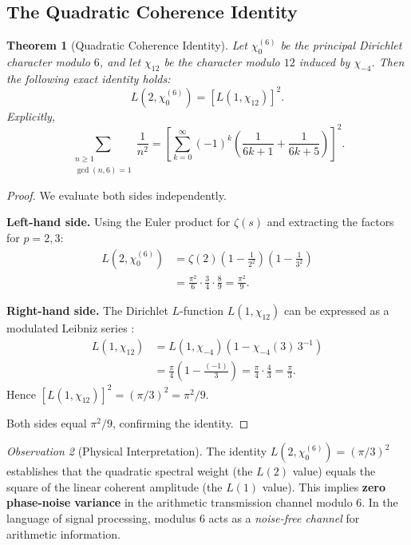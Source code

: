 \documentclass[12pt,a4paper]{article}
\theoremstyle{plain}
\newtheorem{theorem}{Theorem}[section]
\theoremstyle{definition}
\theoremstyle{remark}
\newtheorem{observation}[theorem]{Observation}
\begin{document}
\subsection{The Quadratic Coherence Identity}

\begin{theorem}[Quadratic Coherence Identity]
\label{thm:identity}
Let $\chi_0^{(6)}$ be the principal Dirichlet character modulo $6$, and let $\chi_{12}$ be the character modulo $12$ induced by $\chi_{-4}$. Then the following exact identity holds:
\begin{equation}
L(2, \chi_0^{(6)}) = \left[ L(1, \chi_{12}) \right]^2.
\label{eq:identity}
\end{equation}
Explicitly,
\begin{equation}
\sum_{\substack{n \geq 1 \\ \gcd(n,6)=1}} \frac{1}{n^2} = \left[ \sum_{k=0}^{\infty} (-1)^k \left( \frac{1}{6k+1} + \frac{1}{6k+5} \right) \right]^2.
\label{eq:identity_explicit}
\end{equation}
\end{theorem}

\begin{proof}
We evaluate both sides independently.

\textbf{Left-hand side.} Using the Euler product for $\zeta(s)$ and extracting the factors for $p=2,3$:
\begin{align*}
L(2, \chi_0^{(6)}) &= \zeta(2) \left(1 - \frac{1}{2^2}\right) \left(1 - \frac{1}{3^2}\right) \\
&= \frac{\pi^2}{6} \cdot \frac{3}{4} \cdot \frac{8}{9} = \frac{\pi^2}{9}.
\end{align*}

\textbf{Right-hand side.} The Dirichlet $L$-function $L(1, \chi_{12})$ can be expressed as a modulated Leibniz series \cite{davenport2000}:
\begin{align*}
L(1, \chi_{12}) &= L(1, \chi_{-4}) \left(1 - \chi_{-4}(3) \, 3^{-1}\right) \\
&= \frac{\pi}{4} \left(1 - \frac{(-1)}{3}\right) = \frac{\pi}{4} \cdot \frac{4}{3} = \frac{\pi}{3}.
\end{align*}
Hence $[L(1, \chi_{12})]^2 = (\pi/3)^2 = \pi^2/9$.

Both sides equal $\pi^2/9$, confirming the identity.
\end{proof}

\begin{observation}[Physical Interpretation]
The identity $L(2, \chi_0^{(6)}) = (\pi/3)^2$ establishes that the quadratic spectral weight (the $L(2)$ value) equals the square of the linear coherent amplitude (the $L(1)$ value). This implies \textbf{zero phase-noise variance} in the arithmetic transmission channel modulo $6$. In the language of signal processing, modulus $6$ acts as a \emph{noise-free channel} for arithmetic information.
\end{observation}
\end{document}

